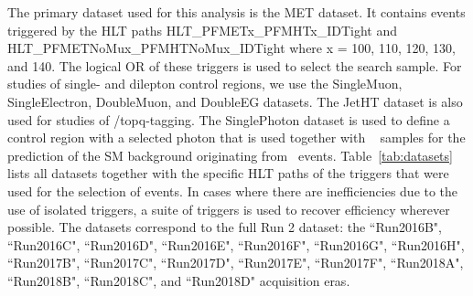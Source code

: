 \label{sec:samples}
The primary dataset used for this analysis is the MET dataset.
It contains events triggered by the HLT paths HLT\_PFMETx\_PFMHTx\_IDTight and HLT\_PFMETNoMux\_PFMHTNoMux\_IDTight where x = 100, 110, 120, 130, and 140. The logical OR of these triggers is used to select the search sample. 
 For studies of single- and dilepton control regions, we use the SingleMuon, SingleElectron, DoubleMuon, and DoubleEG datasets. The JetHT dataset is also used for studies of \W/topq-tagging. The SinglePhoton dataset is used to define a control region with a selected photon that is used together with \Zll~  samples for the prediction of the SM background originating from \Znunu~events. Table~\ref{tab:datasets} lists all datasets together with the specific HLT paths of the triggers that were used for the selection of events. In cases where there are inefficiencies due to the use of isolated triggers, a suite of triggers is used to recover efficiency wherever possible. The datasets correspond to the full Run 2 dataset: the ``Run2016B", ``Run2016C", ``Run2016D", ``Run2016E", ``Run2016F", ``Run2016G", ``Run2016H", ``Run2017B", ``Run2017C", ``Run2017D", ``Run2017E", ``Run2017F", ``Run2018A", ``Run2018B", ``Run2018C", and ``Run2018D" acquisition eras.

